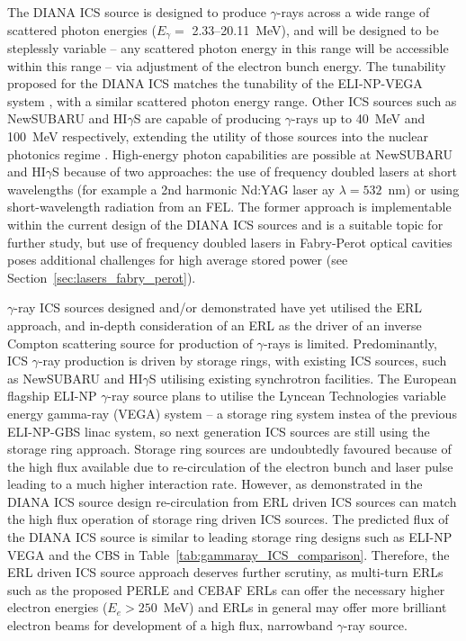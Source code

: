 \documentclass[../main.tex]{subfiles}
\begin{document}
The DIANA ICS source is designed to produce $\gamma$-rays across a wide range of scattered photon energies ($E_{\gamma}=$ 2.33--20.11~\si{\mega\electronvolt}), and will be designed to be steplessly variable -- any scattered photon energy in this range will be accessible within this range -- via adjustment of the electron bunch energy. The tunability proposed for the DIANA ICS matches the tunability of the ELI-NP-VEGA system \cite{tanaka2020current,elinp2019vega}, with a similar scattered photon energy range. Other ICS sources such as NewSUBARU and HI$\gamma$S are capable of producing $\gamma$-rays up to 40~\si{\mega\electronvolt} and 100~\si{\mega\electronvolt} respectively, extending the utility of those sources into the nuclear photonics regime \cite{budker2021expanding}. High-energy photon capabilities are possible at NewSUBARU and HI$\gamma$S because of two approaches: the use of frequency doubled lasers at short wavelengths (for example a 2nd harmonic Nd:YAG laser ay $\lambda = 532$~\si{\nano\meter}) or using short-wavelength radiation from an FEL. The former approach is implementable within the current design of the DIANA ICS sources and is a suitable topic for further study, but use of frequency doubled lasers in Fabry-Perot optical cavities poses additional challenges for high average stored power (see Section~\ref{sec:lasers_fabry_perot}).

$\gamma$-ray ICS sources designed and/or demonstrated have yet utilised the ERL approach, and in-depth consideration of an ERL as the driver of an inverse Compton scattering source for production of $\gamma$-rays is limited. Predominantly, ICS $\gamma$-ray production is driven by storage rings, with existing ICS sources, such as NewSUBARU \cite{utsunomiya2015gamma} and HI$\gamma$S \cite{weller2009research} utilising existing synchrotron facilities. The European flagship ELI-NP $\gamma$-ray source plans to utilise the Lyncean Technologies variable energy gamma-ray (VEGA) system \cite{tanaka2020current,elinp2019vega} -- a storage ring system instea of the previous ELI-NP-GBS \cite{adriani2014technical} linac system, so next generation ICS sources are still using the storage ring approach. Storage ring sources are undoubtedly favoured because of the high flux available due to re-circulation of the electron bunch and laser pulse leading to a much higher interaction rate. However, as demonstrated in the DIANA ICS source design re-circulation from ERL driven ICS sources can match the high flux operation of storage ring driven ICS sources. The predicted flux of the DIANA ICS source is similar to leading storage ring designs such as ELI-NP VEGA and the CBS \cite{pan2019design} in Table~\ref{tab:gammaray_ICS_comparison}. Therefore, the ERL driven ICS source approach deserves further scrutiny, as multi-turn ERLs such as the proposed PERLE \cite{angal2018perle} and CEBAF \cite{meot2016er} ERLs can offer the necessary higher electron energies ($E_{e} > 250$~\si{\mega\electronvolt}) and ERLs in general may offer more brilliant electron beams \cite{adolphsen2022european} for development of a high flux, narrowband $\gamma$-ray source. 
\end{document}
